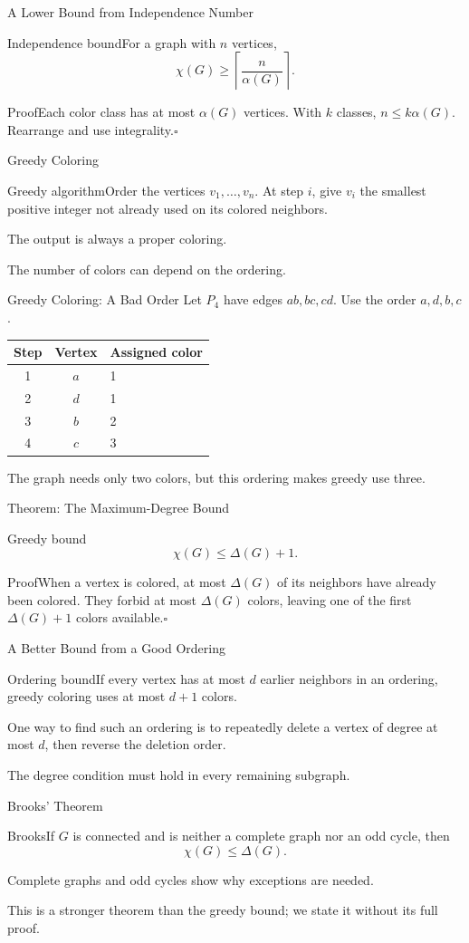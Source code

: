 \documentclass[aspectratio=169,11pt]{beamer}
\newcommand{\Def}[2]{\begin{block}{#1}#2\end{block}}
\newcommand{\Thm}[2]{\begin{block}{#1}#2\end{block}}
\renewcommand{\Proof}[1]{\begin{block}{Proof}\normalsize #1\end{block}}
\newcommand{\gap}{\par\medskip}
\begin{document}
\begin{frame}{A Lower Bound from Independence Number}
\large
\Thm{Independence bound}{For a graph with $n$ vertices,\[\chi(G)\ge\left\lceil\frac{n}{\alpha(G)}\right\rceil.\]}
\Proof{Each color class has at most $\alpha(G)$ vertices. With $k$ classes, $n\le k\alpha(G)$. Rearrange and use integrality.\hfill$\square$}
\end{frame}
\begin{frame}{Greedy Coloring}
\large
\Def{Greedy algorithm}{Order the vertices $v_1,\ldots,v_n$. At step $i$, give $v_i$ the smallest positive integer not already used on its colored neighbors.}
\gap The output is always a proper coloring.
\gap The number of colors can depend on the ordering.
\end{frame}
\begin{frame}{Greedy Coloring: A Bad Order}
\large
Let $P_4$ have edges $ab,bc,cd$. Use the order $a,d,b,c$.
\begin{center}\begin{tabular}{ccl}\toprule Step&Vertex&Assigned color\\\midrule1&$a$&1\\2&$d$&1\\3&$b$&2\\4&$c$&3\\\bottomrule\end{tabular}\end{center}
\gap The graph needs only two colors, but this ordering makes greedy use three.
\end{frame}
\begin{frame}{Theorem: The Maximum-Degree Bound}
\large
\Thm{Greedy bound}{\[\chi(G)\le\Delta(G)+1.\]}
\Proof{When a vertex is colored, at most $\Delta(G)$ of its neighbors have already been colored. They forbid at most $\Delta(G)$ colors, leaving one of the first $\Delta(G)+1$ colors available.\hfill$\square$}
\end{frame}
\begin{frame}{A Better Bound from a Good Ordering}
\large
\Thm{Ordering bound}{If every vertex has at most $d$ earlier neighbors in an ordering, greedy coloring uses at most $d+1$ colors.}
\gap One way to find such an ordering is to repeatedly delete a vertex of degree at most $d$, then reverse the deletion order.
\gap The degree condition must hold in every remaining subgraph.
\end{frame}
\begin{frame}{Brooks' Theorem}
\large
\Thm{Brooks}{If $G$ is connected and is neither a complete graph nor an odd cycle, then\[\chi(G)\le\Delta(G).\]}
\gap Complete graphs and odd cycles show why exceptions are needed.
\gap This is a stronger theorem than the greedy bound; we state it without its full proof.
\end{frame}
\end{document}
